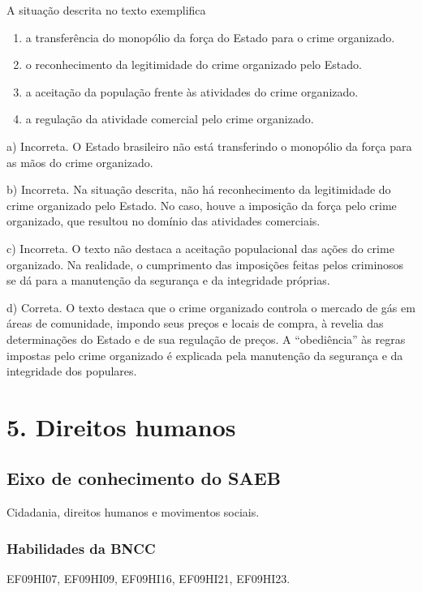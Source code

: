 A situação descrita no texto exemplifica

\begin{enumerate}
\def\labelenumi{\alph{enumi})}
\item
  a transferência do monopólio da força do Estado para o crime
  organizado.
\item
  o reconhecimento da legitimidade do crime organizado pelo Estado.
\item
  a aceitação da população frente às atividades do crime organizado.
\item
  a regulação da atividade comercial pelo crime organizado.
\end{enumerate}

a) Incorreta. O Estado brasileiro não está transferindo o monopólio da
força para as mãos do crime organizado.

b) Incorreta. Na situação descrita, não há reconhecimento da
legitimidade do crime organizado pelo Estado. No caso, houve a imposição
da força pelo crime organizado, que resultou no domínio das atividades
comerciais.

c) Incorreta. O texto não destaca a aceitação populacional das ações do
crime organizado. Na realidade, o cumprimento das imposições feitas
pelos criminosos se dá para a manutenção da segurança e da integridade
próprias.

d) Correta. O texto destaca que o crime organizado controla o mercado de
gás em áreas de comunidade, impondo seus preços e locais de compra, à
revelia das determinações do Estado e de sua regulação de preços. A
``obediência'' às regras impostas pelo crime organizado é explicada pela
manutenção da segurança e da integridade dos populares.

\chapter{5. Direitos humanos}

\section{Eixo de conhecimento do SAEB} Cidadania, direitos humanos e
movimentos sociais.

\subsection{Habilidades da BNCC} EF09HI07, EF09HI09, EF09HI16, EF09HI21,
EF09HI23.

